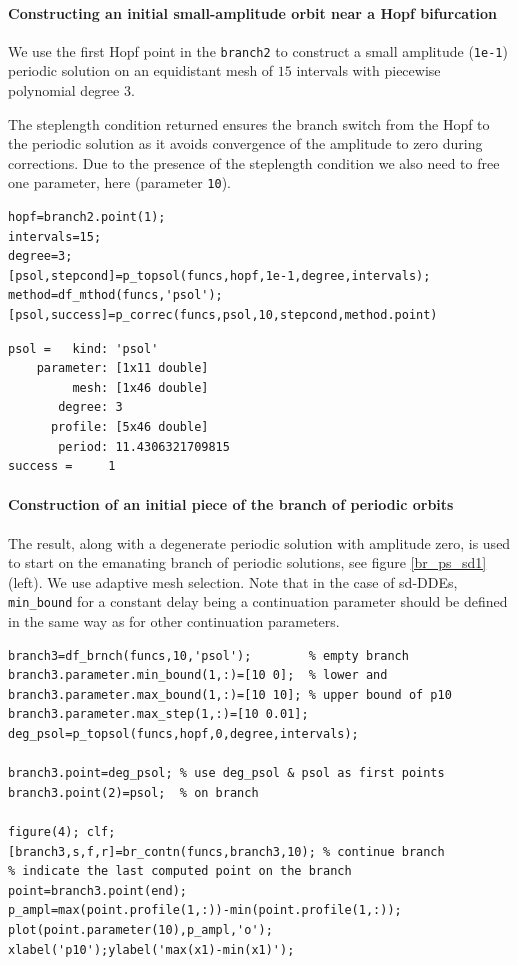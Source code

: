 \documentclass[10pt]{scrartcl}
\newcommand{\blist}[1]{\mbox{\lstinline!#1!}}
\begin{document}
\paragraph{Constructing an initial small-amplitude orbit near a Hopf bifurcation}
We use the first Hopf point in the \blist{branch2} to construct a small
amplitude (\texttt{1e-1}) periodic solution on an equidistant mesh of $15$
intervals with piecewise polynomial degree $3$.

The steplength condition returned ensures the branch switch from the
Hopf to the periodic solution as it avoids convergence of the
amplitude to zero during corrections. Due to the presence of the
steplength condition we also need to free one parameter, here
(parameter \texttt{10}).
\begin{lstlisting}
hopf=branch2.point(1);
intervals=15;
degree=3;
[psol,stepcond]=p_topsol(funcs,hopf,1e-1,degree,intervals);
method=df_mthod(funcs,'psol');
[psol,success]=p_correc(funcs,psol,10,stepcond,method.point)
\end{lstlisting}
{\small
\begin{verbatim}
psol =   kind: 'psol'
    parameter: [1x11 double]
         mesh: [1x46 double]
       degree: 3
      profile: [5x46 double]
       period: 11.4306321709815
success =     1
\end{verbatim}
}
\paragraph{Construction of an initial piece of the branch of periodic orbits}
The result, along with a degenerate periodic solution with amplitude
zero, is used to start on the emanating branch of periodic solutions,
see figure \ref{br_ps_sd1} (left). We use adaptive mesh selection.
Note that in the case of sd-DDEs, \blist{min_bound}
for a constant delay being a continuation parameter
should be defined in the same way as for other continuation parameters.
\begin{lstlisting}
branch3=df_brnch(funcs,10,'psol');        % empty branch
branch3.parameter.min_bound(1,:)=[10 0];  % lower and
branch3.parameter.max_bound(1,:)=[10 10]; % upper bound of p10
branch3.parameter.max_step(1,:)=[10 0.01];
deg_psol=p_topsol(funcs,hopf,0,degree,intervals);

branch3.point=deg_psol; % use deg_psol & psol as first points
branch3.point(2)=psol;  % on branch

figure(4); clf;
[branch3,s,f,r]=br_contn(funcs,branch3,10); % continue branch
% indicate the last computed point on the branch
point=branch3.point(end);
p_ampl=max(point.profile(1,:))-min(point.profile(1,:));
plot(point.parameter(10),p_ampl,'o');
xlabel('p10');ylabel('max(x1)-min(x1)');  
\end{lstlisting}
\end{document}
